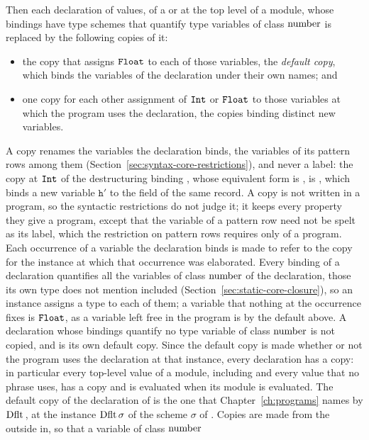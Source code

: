 Then each declaration of values, of a  or at the top level of a
module, whose bindings have type schemes that quantify type variables of class $\mathrm{number}$ is
replaced by the following copies of it:
\begin{itemize}
\item the copy that assigns $\mathtt{Float}$ to each of those variables, the
  \emph{default copy}, which binds the variables of the declaration under
  their own names; and
\item one copy for each other assignment of $\mathtt{Int}$ or $\mathtt{Float}$ to those
  variables at which the program uses the declaration, the copies binding
  distinct new variables.
\end{itemize}
A copy renames the variables the declaration binds, the variables of its
pattern rows among them (Section~\ref{sec:syntax-core-restrictions}), and
never a label: the copy at $\mathtt{Int}$ of the destructuring binding
, whose
equivalent form is , is
, which binds a new variable
$\mathtt{h}'$ to the field  of the same record. A copy is not written
in a program, so the syntactic restrictions do not judge it; it keeps every
property they give a program, except that the variable of a pattern row need
not be spelt as its label, which the restriction on pattern rows requires
only of a program.
Each occurrence of a variable the declaration binds is made to refer to the
copy for the instance at which that occurrence was elaborated. Every binding
of a declaration quantifies all the variables of class $\mathrm{number}$ of the
declaration, those its own type does not mention included
(Section~\ref{sec:static-core-closure}), so an instance assigns a type to each
of them; a variable that nothing at the occurrence fixes is $\mathtt{Float}$, as a
variable left free in the program is by the default above. %
A declaration
whose bindings quantify no type variable of class $\mathrm{number}$ is not copied, and
is its own default copy. Since the
default copy is made whether or not the program uses the declaration at that
instance, every declaration has a copy: in particular every top-level value
of a module, including  and every value that no phrase uses, has a
copy and is evaluated when its module is evaluated. %
The default copy of the declaration of  is the one that
Chapter~\ref{ch:programs} names by $\mathrm{Dflt}\,$, at the instance
$\mathrm{Dflt}\,\sigma$ of the scheme $\sigma$ of . %
Copies are made from the outside in, so that a variable of class $\mathrm{number}$
